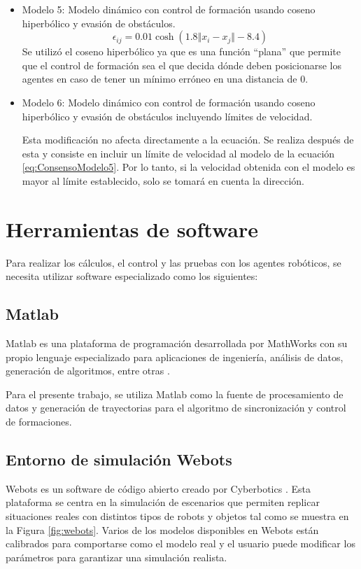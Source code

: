 \begin{itemize}
	\item Modelo 5: Modelo dinámico con control de formación usando coseno hiperbólico y evasión de obstáculos.
	\begin{equation}
		\epsilon_{ij} = 0.01\cosh{(1.8 \Vert x_i - x_j \Vert - 8.4)}
		\label{eq:ConsensoModelo5}
	\end{equation}
	Se utilizó el coseno hiperbólico ya que es una función ``plana'' que permite que el control de formación sea el que decida dónde deben posicionarse los agentes en caso de tener un mínimo erróneo en una distancia de 0.
	
	\item Modelo 6: Modelo dinámico con control de formación usando coseno hiperbólico y evasión de obstáculos incluyendo límites de velocidad.\par
	Esta modificación no afecta directamente a la ecuación. Se realiza después de esta y consiste en incluir un límite de velocidad al modelo de la ecuación \ref{eq:ConsensoModelo5}. Por lo tanto, si la velocidad obtenida con el modelo es mayor al límite establecido, solo se tomará en cuenta la dirección.
	
\end{itemize}

\section{Herramientas de software}
Para realizar los cálculos, el control y las pruebas con los agentes robóticos, se necesita utilizar software especializado como los siguientes:

\subsection{Matlab}
Matlab es una plataforma de programación desarrollada por MathWorks con su propio lenguaje especializado para aplicaciones de ingeniería, análisis de datos, generación de algoritmos, entre otras \cite{matlab}.

Para el presente trabajo, se utiliza Matlab como la fuente de procesamiento de datos y generación de trayectorias para el algoritmo de sincronización y control de formaciones.

\subsection{Entorno de simulación Webots}
Webots es un software de código abierto creado por Cyberbotics \cite{webots}. Esta plataforma se centra en la simulación de escenarios que permiten replicar situaciones reales con distintos tipos de robots y objetos tal como se muestra en la Figura \ref{fig:webots}. Varios de los modelos disponibles en Webots están calibrados para comportarse como el modelo real y el usuario puede modificar los parámetros para garantizar una simulación realista.

